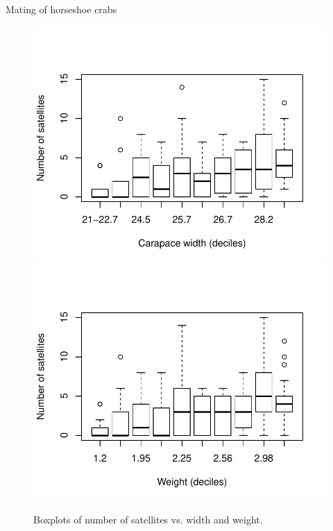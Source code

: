 \documentclass[11pt]{book}\usepackage[]{graphicx}\usepackage[]{color}
\newenvironment{knitrout}{}{} %
\renewenvironment{knitrout}{\small\renewcommand{\baselinestretch}{.85}}{} %
\begin{document}
\begin{Example}[crabs1]{Mating of horseshoe crabs}
\begin{knitrout}
\begin{figure}[!htbp]
\centerline{\includegraphics[width=.49\textwidth]{ch09/fig/crabs1-boxplots-1} 
\includegraphics[width=.49\textwidth]{ch09/fig/crabs1-boxplots-2} }

\caption[Boxplots of number of satellites vs]{Boxplots of number of satellites vs. width and weight.\label{fig:crabs1-boxplots}}
\end{figure}


\end{knitrout}


\end{Example}
\end{document}
